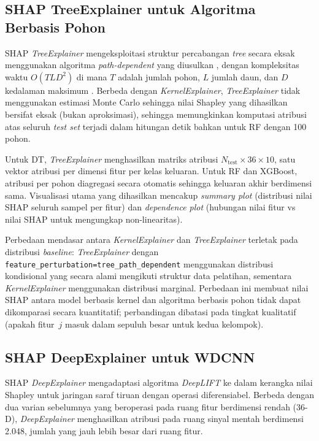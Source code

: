 \subsection{SHAP TreeExplainer untuk Algoritma Berbasis Pohon}
\label{subsec:bab4_shap_tree}

SHAP \emph{TreeExplainer} mengeksploitasi struktur percabangan \emph{tree}
secara eksak menggunakan algoritma \emph{path-dependent} yang diusulkan
{\color{blue}}, dengan kompleksitas waktu $O(TLD^2)$ di mana $T$
adalah jumlah pohon, $L$ jumlah daun, dan $D$ kedalaman maksimum
.
Berbeda dengan \emph{KernelExplainer}, \emph{TreeExplainer} tidak menggunakan
estimasi Monte Carlo sehingga nilai Shapley yang dihasilkan bersifat eksak
(bukan aproksimasi), sehingga memungkinkan komputasi atribusi atas seluruh \emph{test
set} terjadi dalam hitungan detik bahkan untuk RF dengan 100 pohon.

Untuk DT, \emph{TreeExplainer} menghasilkan matriks atribusi $N_\text{test}
\times 36 \times 10$, satu vektor atribusi per dimensi fitur per kelas
keluaran.
Untuk RF dan XGBoost, atribusi per pohon diagregasi secara otomatis sehingga
keluaran akhir berdimensi sama.
Visualisasi utama yang dihasilkan mencakup \emph{summary plot} (distribusi
nilai SHAP seluruh sampel per fitur) dan \emph{dependence plot} (hubungan
nilai fitur vs nilai SHAP untuk mengungkap non-linearitas).

Perbedaan mendasar antara \emph{KernelExplainer} dan \emph{TreeExplainer}
terletak pada distribusi \emph{baseline}: \emph{TreeExplainer}
dengan \texttt{feature\_perturbation=\textquotesingle tree\_path\_dependent\textquotesingle}
menggunakan distribusi kondisional yang secara alami mengikuti struktur data
pelatihan, sementara \emph{KernelExplainer} menggunakan distribusi marginal.
Perbedaan ini membuat nilai SHAP antara model berbasis kernel dan algoritma
berbasis pohon tidak dapat dikomparasi secara kuantitatif; perbandingan
dibatasi pada tingkat kualitatif (apakah fitur~$j$ masuk dalam sepuluh besar
untuk kedua kelompok).

\subsection{SHAP DeepExplainer untuk WDCNN}
\label{subsec:bab4_shap_deep}

SHAP \emph{DeepExplainer} mengadaptasi algoritma \emph{DeepLIFT}
 ke dalam kerangka nilai Shapley untuk
jaringan saraf tiruan dengan operasi diferensiabel.
Berbeda dengan dua varian sebelumnya yang beroperasi pada ruang fitur
berdimensi rendah (36-D), \emph{DeepExplainer} menghasilkan atribusi pada
ruang sinyal mentah berdimensi 2.048, jumlah yang jauh lebih besar dari ruang fitur.

